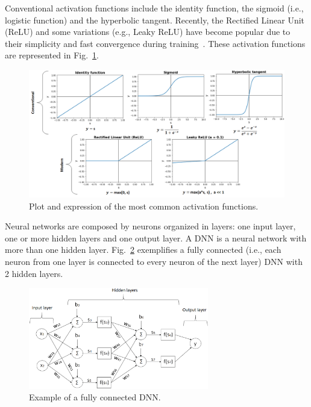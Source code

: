 Conventional activation functions include the identity function, the sigmoid (i.e., logistic function) and the hyperbolic tangent. Recently, the Rectified Linear Unit (ReLU) and some variations (e.g., Leaky ReLU) have become popular due to their simplicity and fast convergence during training~\cite{sze:dnn_survey}. These activation functions are represented in Fig.~\ref{fig:act_func}.    

\begin{figure}[!htb]
  \centering
  \includegraphics[width=\textwidth]{Figures/act_functions.png}
  \caption{Plot and expression of the most common activation functions.}
  \label{fig:act_func}
\end{figure}

Neural networks are composed by neurons organized in layers: one input layer, one or more hidden layers and one output layer. A DNN is a neural network with more than one hidden layer. Fig.~\ref{fig:DNN} exemplifies a fully connected (i.e., each neuron from one layer is connected to every neuron of the next layer) DNN with 2 hidden layers.

\vspace{-0.4cm}
\begin{figure}[!htb]
  \centering
  \includegraphics[width=0.7\textwidth]{Figures/DNN.png}
  \caption{Example of a fully connected DNN.}
  \label{fig:DNN}
\end{figure}

